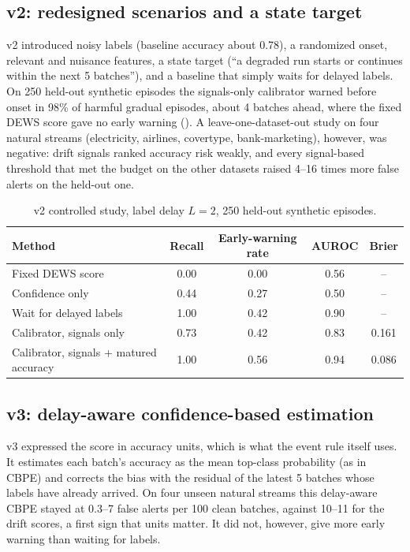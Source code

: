 \subsection{v2: redesigned scenarios and a state target}
\label{sec:v2}
v2 introduced noisy labels (baseline accuracy about 0.78), a randomized onset, relevant and nuisance features, a state target (``a degraded run starts or continues within the next 5 batches''), and a baseline that simply waits for delayed labels. On 250 held-out synthetic episodes the signals-only calibrator warned before onset in 98\% of harmful gradual episodes, about 4 batches ahead, where the fixed DEWS score gave no early warning (). A leave-one-dataset-out study on four natural streams (electricity, airlines, covertype, bank-marketing), however, was negative: drift signals ranked accuracy risk weakly, and every signal-based threshold that met the budget on the other datasets raised 4--16 times more false alerts on the held-out one.

\begin{table}[H]
\caption{v2 controlled study, label delay $L=2$, 250 held-out synthetic episodes.}
\label{tab:v2}
\centering
\small
\begin{tabular}{@{}lcccc@{}}
\toprule
Method & Recall & Early-warning rate & AUROC & Brier \\
\midrule
Fixed DEWS score & 0.00 & 0.00 & 0.56 & -- \\
Confidence only & 0.44 & 0.27 & 0.50 & -- \\
Wait for delayed labels & 1.00 & 0.42 & 0.90 & -- \\
Calibrator, signals only & 0.73 & 0.42 & 0.83 & 0.161 \\
Calibrator, signals + matured accuracy & 1.00 & 0.56 & 0.94 & 0.086 \\
\bottomrule
\end{tabular}
\end{table}

\subsection{v3: delay-aware confidence-based estimation}
v3 expressed the score in accuracy units, which is what the event rule itself uses. It estimates each batch's accuracy as the mean top-class probability (as in CBPE) and corrects the bias with the residual of the latest 5 batches whose labels have already arrived. On four unseen natural streams this delay-aware CBPE stayed at 0.3--7 false alerts per 100 clean batches, against 10--11 for the drift scores, a first sign that units matter. It did not, however, give more early warning than waiting for labels.

